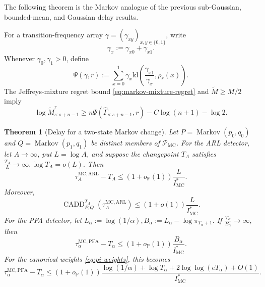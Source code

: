 \documentclass[12pt]{article}
\DeclareMathOperator{\Markov}{Markov}
\theoremstyle{spaced}
\newtheorem{theorem}{Theorem}[section]
\theoremstyle{remark}
\newcommand{\kl}{\mathrm{kl}}
\begin{document}
The following theorem is the Markov analogue of the previous
sub-Gaussian, bounded-mean, and Gaussian delay results.

For a transition-frequency array
\(\gamma=(\gamma_{xy})_{x,y\in\{0,1\}}\), write
\[
    \gamma_x:=\gamma_{x0}+\gamma_{x1}.
\]
Whenever \(\gamma_0,\gamma_1>0\), define
\[
    \Psi(\gamma,r)
    :=
    \sum_{x=0}^1
    \gamma_x
    \kl\left(
        \frac{\gamma_{x1}}{\gamma_x},
        \rho_r(x)
    \right).
\]
The Jeffreys-mixture regret bound \eqref{eq:markov-mixture-regret}
and \(\widetilde M\ge M/2\) imply
\[
    \log\widetilde M_{s:s+n-1}^{r}
    \ge
    n\Psi(\widehat\Gamma_{s:s+n-1},r)
    -C\log(n+1)-\log2.
\]

\begin{theorem}[Delay for a two-state Markov change]
\label{thm:markov-delay}
Let \(P=\Markov(p_0,q_0)\) and \(Q=\Markov(p_1,q_1)\) be distinct
members of \(\mathcal P_{\mathrm{MC}}\).
For the ARL detector, let \(A\to\infty\), put \(L=\log A\), and suppose
the changepoint \(T_A\) satisfies
$\frac{T_A}{L}\longrightarrow\infty,
    \log T_A=o(L).$
Then
\[
    \tau_A^{\mathrm{MC},\mathrm{ARL}}-T_A
    \le
    (1+o_{\mathbb P}(1))
    \frac{L}{I_{\mathrm{MC}}^*}.
\]
Moreover,
\[
    \operatorname{CADD}_{P,Q}^{T_A}
    \left(
        \tau_A^{\mathrm{MC},\mathrm{ARL}}
    \right)
    \le
    (1+o(1))
    \frac{L}{I_{\mathrm{MC}}^*}.
\]
For the PFA detector, let
$L_\alpha:=\log(1/\alpha),
    B_\alpha
    :=
    L_\alpha-\log\pi_{T_\alpha+1}.$
If $   \frac{T_\alpha}{B_\alpha}\longrightarrow\infty,$
then
\[
    \tau_\alpha^{\mathrm{MC},\mathrm{PFA}}-T_\alpha
    \le
    (1+o_{\mathbb P}(1))
    \frac{B_\alpha}{I_{\mathrm{MC}}^*}.
\]
For the canonical weights \eqref{eq:pi-weights},
this becomes
\[
    \tau_\alpha^{\mathrm{MC},\mathrm{PFA}}-T_\alpha
    \le
    (1+o_{\mathbb P}(1))
    \frac{
        \log(1/\alpha)
        +\log T_\alpha
        +2\log\log(eT_\alpha)
        +O(1)
    }{
        I_{\mathrm{MC}}^*
    }.
\]
\end{theorem}
\end{document}

